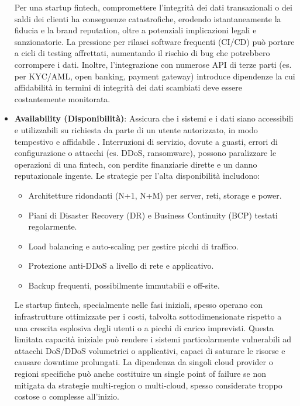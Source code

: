 \begin{itemize}
Per una startup fintech, compromettere l'integrità dei dati transazionali o dei saldi dei clienti ha conseguenze catastrofiche, erodendo istantaneamente la fiducia e la brand reputation, oltre a potenziali implicazioni legali e sanzionatorie. La pressione per rilasci software frequenti (CI/CD) può portare a cicli di testing affrettati, aumentando il rischio di bug che potrebbero corrompere i dati. Inoltre, l'integrazione con numerose API di terze parti (es. per KYC/AML, open banking, payment gateway) introduce dipendenze la cui affidabilità in termini di integrità dei dati scambiati deve essere costantemente monitorata.

\item \textbf{Availability (Disponibilità)}: Assicura che i sistemi e i dati siano accessibili e utilizzabili su richiesta da parte di un utente autorizzato, in modo tempestivo e affidabile \cite{NIST_SP_1800_26}. Interruzioni di servizio, dovute a guasti, errori di configurazione o attacchi (es. DDoS, ransomware), possono paralizzare le operazioni di una fintech, con perdite finanziarie dirette e un danno reputazionale ingente. Le strategie per l'alta disponibilità includono:
\begin{itemize}
    \item Architetture ridondanti (N+1, N+M) per server, reti, storage e power.
    \item Piani di Disaster Recovery (DR) e Business Continuity (BCP) testati regolarmente.
    \item Load balancing e auto-scaling per gestire picchi di traffico.
    \item Protezione anti-DDoS a livello di rete e applicativo.
    \item Backup frequenti, possibilmente immutabili e off-site.
\end{itemize}

Le startup fintech, specialmente nelle fasi iniziali, spesso operano con infrastrutture ottimizzate per i costi, talvolta sottodimensionate rispetto a una crescita esplosiva degli utenti o a picchi di carico imprevisti. Questa limitata capacità iniziale può rendere i sistemi particolarmente vulnerabili ad attacchi DoS/DDoS volumetrici o applicativi, capaci di saturare le risorse e causare downtime prolungati. La dipendenza da singoli cloud provider o regioni specifiche può anche costituire un single point of failure se non mitigata da strategie multi-region o multi-cloud, spesso considerate troppo costose o complesse all'inizio.
\end{itemize}

